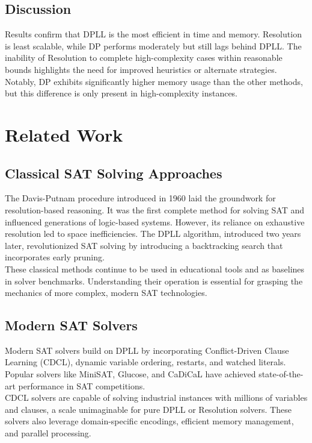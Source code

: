 \documentclass[11pt]{article}
\begin{document}
\subsection{Discussion}
\hspace*{2em}
Results confirm that DPLL is the most efficient in time and memory. Resolution is least scalable, while DP performs moderately but still lags behind DPLL. The inability of Resolution to complete high-complexity cases within reasonable bounds highlights the need for improved heuristics or alternate strategies. Notably, DP exhibits significantly higher memory usage than the other methods, but this difference is only present in high-complexity instances.

\section{Related Work}

\subsection{Classical SAT Solving Approaches}
\hspace*{2em}
The Davis-Putnam procedure introduced in 1960 laid the groundwork for resolution-based reasoning. It was the first complete method for solving SAT and influenced generations of logic-based systems. However, its reliance on exhaustive resolution led to space inefficiencies. The DPLL algorithm, introduced two years later, revolutionized SAT solving by introducing a backtracking search that incorporates early pruning.\\
\hspace*{2em}
These classical methods continue to be used in educational tools and as baselines in solver benchmarks. Understanding their operation is essential for grasping the mechanics of more complex, modern SAT technologies.

\subsection{Modern SAT Solvers}
\hspace*{2em}
Modern SAT solvers build on DPLL by incorporating Conflict-Driven Clause Learning (CDCL), dynamic variable ordering, restarts, and watched literals. Popular solvers like MiniSAT, Glucose, and CaDiCaL have achieved state-of-the-art performance in SAT competitions.\\
\hspace*{2em}
CDCL solvers are capable of solving industrial instances with millions of variables and clauses, a scale unimaginable for pure DPLL or Resolution solvers. These solvers also leverage domain-specific encodings, efficient memory management, and parallel processing.
\end{document}
